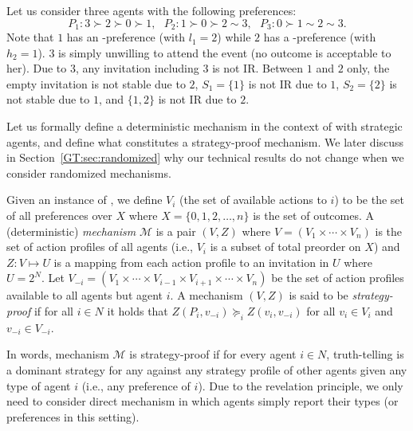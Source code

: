 \begin{example} \label{GT:eg:noStableSet}
	Let us consider three agents with the following preferences: 
	\begin{equation*}
				P_1: 3\succ 2 \succ 0 \succ 1,~~~ P_2: 1 \succ 0 \succ 2 \sim 3,~~~ P_3: 0 \succ 1 \sim 2 \sim 3.
	\end{equation*}
	Note that $1$ has an \INC-preference (with $l_1 = 2$) while $2$ has a \DEC-preference (with  $h_2 = 1$). $3$ is simply unwilling to attend the event (no outcome is acceptable to her).
	Due to $3$, any invitation including $3$ is not IR. Between $1$ and $2$ only, the empty invitation is not stable due to $2$, $S_1 = \{1\}$ is not IR due to $1$, $S_2 = \{2\}$ is not stable due to $1$, and $\{1, 2\}$ is not IR due to $2$.
\end{example}

Let us formally define a deterministic mechanism in the context of \AOIPs with strategic agents, and define what constitutes a strategy-proof mechanism. We later discuss in Section~\ref{GT:sec:randomized} why our technical results do not change when we consider randomized mechanisms.

\begin{definition} \label{GT:def:mechanism}
Given an instance of \AOIP, we define $V_i$ (the set of available actions to $i$) to be the set of all preferences over $X$ where $X = \{0, 1, 2, \dots, n\}$ is the set of outcomes. 
A (deterministic) \emph{mechanism} $\mathcal{M}$ is a pair $(V, Z)$ where $V = (V_1 \times \cdots \times V_n)$ is the set of action profiles of all agents (i.e., $V_i$ is a subset of total preorder on $X$) and $Z: V \mapsto U$ is a mapping from each action profile to an invitation in $U$ where $U = 2^{N}$. 
Let $V_{-i} = (V_1 \times \cdots \times V_{i-1} \times V_{i+1} \times \cdots \times V_{n})$ be the set of action profiles available to all agents but agent $i$. A mechanism $(V, Z)$ is said to be \emph{strategy-proof} if for all $i\in N$ it holds that $Z(P_i, v_{-i}) \succeq_i Z(v_i, v_{-i})$ for all $v_i \in V_i$ and $v_{-i} \in V_{-i}$.
\end{definition}

In words, mechanism $\mathcal{M}$ is strategy-proof if for every agent $i\in N$, truth-telling is a dominant strategy for any against any strategy profile of other agents given any type of agent $i$ (i.e., any preference of $i$). Due to the revelation principle, we only need to consider direct mechanism in which agents simply report their types (or preferences in this setting). 







